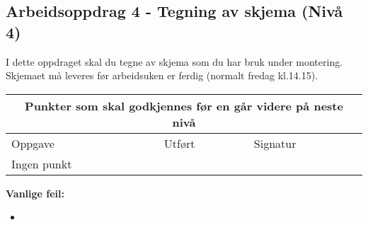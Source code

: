 \subsection*{Arbeidsoppdrag 4 - Tegning av skjema (Nivå 4)}

I dette oppdraget skal du tegne av skjema som du har bruk under montering. Skjemaet må leveres før arbeidsuken er ferdig (normalt fredag kl.14.15). 
\begin{center}
\begin{tabular}{ | m{8cm} | m{1cm}| m{2cm} | } 
\hline
\multicolumn{3}{|c|}{Punkter som skal godkjennes før en går videre på neste nivå} \\
	\hline
	Oppgave	& Utført & Signatur \\ 
	\hline
Ingen punkt& & \\ 
	\hline
\end{tabular}
\end{center}
\textbf{Vanlige feil:}
\begin{itemize}[noitemsep]
	\item 
\end{itemize}
\newpage




\noindent
{}


